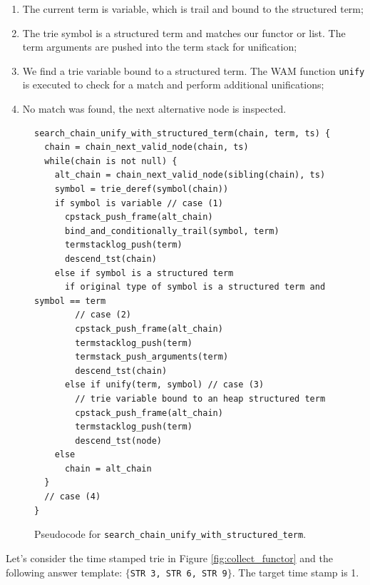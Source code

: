 \begin{enumerate}
  \item The current term is variable, which is trail and bound to the structured term;
  \item The trie symbol is a structured term and matches our functor or list.
  The term arguments are pushed into the term stack for unification;
  \item We find a trie variable bound to a structured term. The WAM function \texttt{unify} is executed to check for a match and perform additional unifications;
  \item No match was found, the next alternative node is inspected.
\end{enumerate}

\begin{figure}[H]
\begin{Verbatim}[fontsize=\small]
search_chain_unify_with_structured_term(chain, term, ts) {
  chain = chain_next_valid_node(chain, ts)
  while(chain is not null) {
    alt_chain = chain_next_valid_node(sibling(chain), ts)
    symbol = trie_deref(symbol(chain))
    if symbol is variable // case (1)
      cpstack_push_frame(alt_chain)
      bind_and_conditionally_trail(symbol, term)
      termstacklog_push(term)
      descend_tst(chain)
    else if symbol is a structured term
      if original type of symbol is a structured term and symbol == term
        // case (2)
        cpstack_push_frame(alt_chain)
        termstacklog_push(term)
        termstack_push_arguments(term)
        descend_tst(chain)
      else if unify(term, symbol) // case (3)
        // trie variable bound to an heap structured term
        cpstack_push_frame(alt_chain)
        termstacklog_push(term)
        descend_tst(node)
    else
      chain = alt_chain
  }
  // case (4)
}
\end{Verbatim}
\caption{Pseudo\-code for \texttt{search\_chain\_unify\_with\_structured\_term}.}
\label{fig:search_chain_unify_with_structured_term}
\end{figure}

Let's consider the time stamped trie in Figure \ref{fig:collect_functor}
and the following answer template: $\{$\texttt{STR 3, STR 6, STR 9}$\}$.
The target time stamp is 1.


